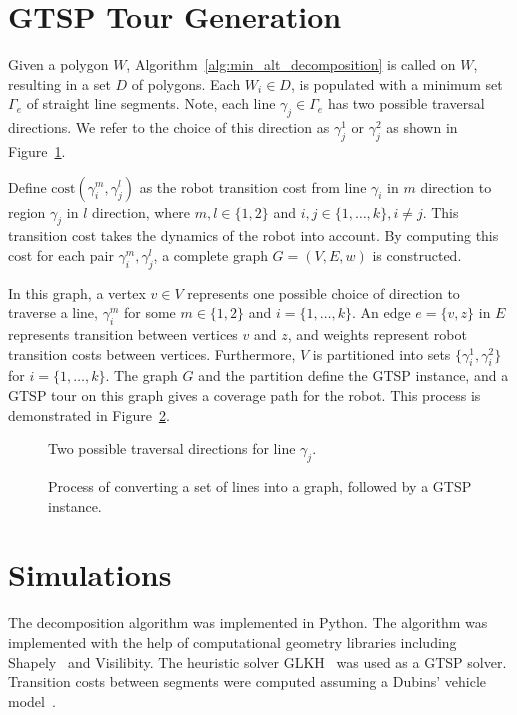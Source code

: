 \documentclass[../main.tex]{subfiles}
\begin{document}
\section{GTSP Tour Generation}
\label{section:single_agent_gtsp_tour}

Given a polygon $W$, Algorithm~\ref{alg:min_alt_decomposition} is called on $W$, resulting in a set $D$ of polygons. Each $W_i\in D$, is populated with a minimum set $\Gamma_e$ of straight line segments. Note, each line $\gamma_j\in\Gamma_e$ has two possible traversal directions. We refer to the choice of this direction as $\gamma_j^1$ or $\gamma_j^2$  as shown in Figure~\ref{fig:traversal_directions}.

Define $\text{cost}(\gamma_i^m, \gamma_j^l)$ as the robot transition cost from line $\gamma_i$ in $m$ direction to region $\gamma_j$ in $l$ direction, where $m,l\in\{1,2\}$ and $i,j\in\{1,\ldots,k\},i\neq j$. This transition cost takes the dynamics of the robot into account. By computing this cost for each pair $\gamma_i^m, \gamma_j^l$, a complete graph $G=(V,E,w)$ is constructed.

In this graph, a vertex $v\in V$ represents one possible choice of direction to traverse a line, $\gamma^m_i$ for some $m\in\{1,2\}$ and $i=\{1,\ldots,k\}$. An edge $e=\{v,z\}$ in $E$ represents transition between vertices $v$ and $z$, and weights represent robot transition costs between vertices. Furthermore, $V$ is partitioned into sets $\{\gamma_i^1,\gamma_i^2\}$ for $i=\{1,\ldots,k\}$. The graph $G$ and the partition define the GTSP instance, and a GTSP tour on this graph gives a coverage path for the robot. This process is demonstrated in Figure~\ref{fig:line_to_gtsp}. 

\begin{figure}
	\centering
	
	\caption{Two possible traversal directions for line $\gamma_j$.}
	\label{fig:traversal_directions}
\end{figure}
\begin{figure}
	\centering
	
	\caption{Process of converting a set of lines into a graph, followed by a GTSP instance.}
	\label{fig:line_to_gtsp}
\end{figure}

\section{Simulations}
\label{section:single_agent_simulation}
The decomposition algorithm was implemented in Python. The algorithm was implemented with the help of computational geometry libraries including Shapely~\cite{Shapely:13} and Visilibity\cite{VisiLibity:08}. The heuristic solver GLKH~\cite{helsgaun2000effective} was used as a GTSP solver. Transition costs between segments were computed assuming a Dubins' vehicle model~\cite{dubins1957curves}.
\end{document}
